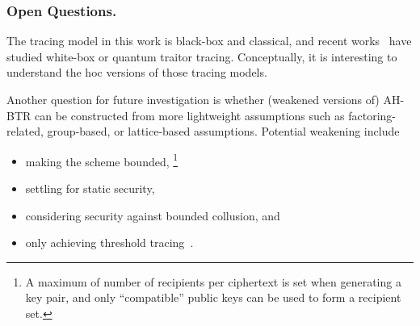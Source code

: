 \subsubsection{Open Questions.}
The tracing model in this work is black-box and classical, and recent works~\cite{C:Zhandry21,TCC:Zhandry20} have studied white-box or quantum traitor tracing.
Conceptually, it is interesting to understand the \ad hoc versions of those tracing models.

Another question for future investigation is whether
(weakened versions of) AH-BTR can be constructed from more lightweight assumptions such as factoring-related, group-based, or lattice-based assumptions.
Potential weakening include
\begin{itemize}
\item making the scheme bounded,%
\footnote{A maximum of number of recipients per ciphertext is set when generating a key pair, and only ``compatible'' public keys can be used to form a recipient set.}
\item settling for static security,
\item considering security against bounded collusion, and
\item only achieving threshold tracing~\cite{C:NaoPin98}.
\end{itemize}

